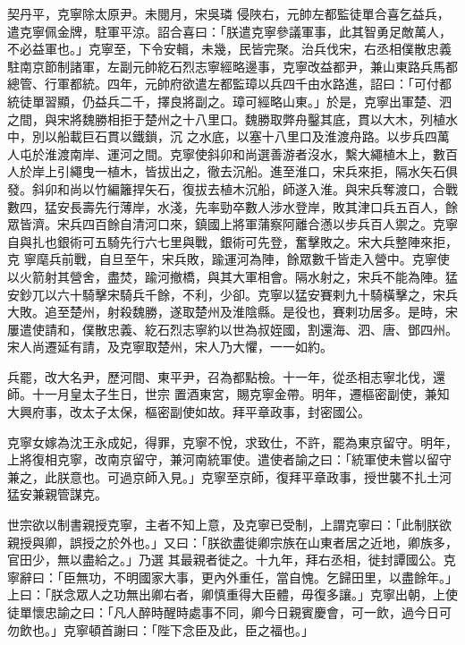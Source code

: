 \begin{pinyinscope}
 契丹平，克寧除太原尹。未閱月，宋吳璘
 侵陜右，元帥左都監徒單合喜乞益兵，遣克寧佩金牌，駐軍平涼。詔合喜曰：「朕遣克寧參議軍事，此其智勇足敵萬人，不必益軍也。」克寧至，下令安輯，未幾，民皆完聚。治兵伐宋，右丞相僕散忠義駐南京節制諸軍，左副元帥紇石烈志寧經略邊事，克寧改益都尹，兼山東路兵馬都總管、行軍都統。四年，元帥府欲遣左都監璋以兵四千由水路進，詔曰：「可付都統徒單習顯，仍益兵二千，擇良將副之。璋可經略山東。」於是，克寧出軍楚、泗之間，與宋將魏勝相拒于楚州之十八里口。魏勝取弊舟鑿其底，貫以大木，列植水中，別以船載巨石貫以鐵鎖，沉
 之水底，以塞十八里口及淮渡舟路。以步兵四萬人屯於淮渡南岸、運河之間。克寧使斜卯和尚選善游者沒水，繫大繩植木上，數百人於岸上引繩曳一植木，皆拔出之，徹去沉船。進至淮口，宋兵來拒，隔水矢石俱發。斜卯和尚以竹編籬捍矢石，復拔去植木沉船，師遂入淮。與宋兵奪渡口，合戰數四，猛安長壽先行薄岸，水淺，先率勁卒數人涉水登岸，敗其津口兵五百人，餘眾皆濟。宋兵四百餘自清河口來，鎮國上將軍蒲察阿離合懣以步兵百人禦之。克寧自與扎也銀術可五騎先行六七里與戰，銀術可先登，奮擊敗之。宋大兵整陣來拒，克
 寧麾兵前戰，自旦至午，宋兵敗，踰運河為陣，餘眾數千皆走入營中。克寧使以火箭射其營舍，盡焚，踰河撤橋，與其大軍相會。隔水射之，宋兵不能為陣。猛安鈔兀以六十騎擊宋騎兵千餘，不利，少卻。克寧以猛安賽剌九十騎橫擊之，宋兵大敗。追至楚州，射殺魏勝，遂取楚州及淮陰縣。是役也，賽剌功居多。是時，宋屢遣使請和，僕散忠義、紇石烈志寧約以世為叔姪國，割還海、泗、唐、鄧四州。宋人尚遷延有請，及克寧取楚州，宋人乃大懼，一一如約。



 兵罷，改大名尹，歷河間、東平尹，召為都點檢。十一年，從丞相志寧北伐，還師。十一月皇太子生日，世宗
 置酒東宮，賜克寧金帶。明年，遷樞密副使，兼知大興府事，改太子太保，樞密副使如故。拜平章政事，封密國公。



 克寧女嫁為沈王永成妃，得罪，克寧不悅，求致仕，不許，罷為東京留守。明年，上將復相克寧，改南京留守，兼河南統軍使。遣使者諭之曰：「統軍使未嘗以留守兼之，此朕意也。可過京師入見。」克寧至京師，復拜平章政事，授世襲不扎土河猛安兼親管謀克。



 世宗欲以制書親授克寧，主者不知上意，及克寧已受制，上謂克寧曰：「此制朕欲親授與卿，誤授之於外也。」又曰：「朕欲盡徙卿宗族在山東者居之近地，卿族多，官田少，無以盡給之。」乃選
 其最親者徙之。十九年，拜右丞相，徙封譚國公。克寧辭曰：「臣無功，不明國家大事，更內外重任，當自愧。乞歸田里，以盡餘年。」上曰：「朕念眾人之功無出卿右者，卿慎重得大臣體，毋復多讓。」克寧出朝，上使徒單懷忠諭之曰：「凡人醉時醒時處事不同，卿今日親賓慶會，可一飲，過今日可勿飲也。」克寧頓首謝曰：「陛下念臣及此，臣之福也。」




\end{pinyinscope}
